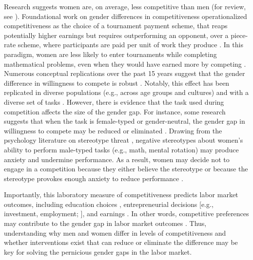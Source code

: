 \documentclass[a4paper, nobind]{templates/ociamthesis}
\begin{document}
Research suggests women are, on average, less competitive than men (for review, see \textcite{Niederle2011}). Foundational work on gender differences in competitiveness operationalized competitiveness as the choice of a tournament payment scheme, that reaps potentially higher earnings but requires outperforming an opponent, over a piece-rate scheme, where participants are paid per unit of work they produce \autocite{Niederle2007}. In this paradigm, women are less likely to enter tournaments while completing mathematical problems, even when they would have earned more by competing \autocite{Niederle2007}. Numerous conceptual replications over the past 15 years suggest that the gender difference in willingness to compete is robust \autocites[see][ for review]{Niederle2011,Niederle2017a,Niederle2017b}. Notably, this effect has been replicated in diverse populations (e.g., across age groups and cultures) \autocite{Apicella2015,Buser2014,Sutter2016,Andersen2013,Buser2017b,Sutter2010,Dreber2014,Mayr2012} and with a diverse set of tasks \autocite{Apicella2015,Saccardo2018,Bjorvatn2016,Sutter2015,Frick2011,Samek2019}. However, there is evidence that the task used during competition affects the size of the gender gap. For instance, some research suggests that when the task is female-typed or gender-neutral, the gender gap in willingness to compete may be reduced or eliminated \autocite{Iriberri2017,Boschini2014,Boschini2019,Apicella2015,Grosse2010,Gunther2010,Dreber2014,Dreber2011,Shurchkov2012}. Drawing from the psychology literature on stereotype threat \autocite{Steele1997,Spencer1999,Spencer2016}, negative stereotypes about women's ability to perform male-typed tasks (e.g., math, mental rotation) may produce anxiety and undermine performance. As a result, women may decide not to engage in a competition because they either believe the stereotype or because the stereotype provokes enough anxiety to reduce performance \autocite{Gunther2010,Grosse2010,Iriberri2017,Shurchkov2012}.

Importantly, this laboratory measure of competitiveness predicts labor market outcomes, including education choices \autocite{Buser2014,Zhang2012}, entrepreneurial decisions {[}e.g., investment, employment; \textcite{Berge2015}{]}, and earnings \autocite{Reuben2015}. In other words, competitive preferences may contribute to the gender gap in labor market outcomes \autocite{Blau2017}. Thus, understanding why men and women differ in levels of competitiveness and whether interventions exist that can reduce or eliminate the difference may be key for solving the pernicious gender gaps in the labor market.
\end{document}
